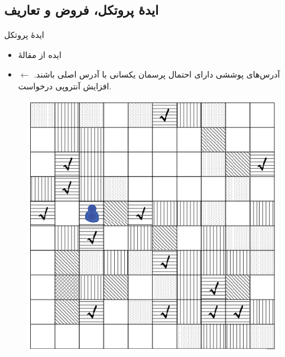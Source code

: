 \documentclass{beamer}
\begin{document}
\subsection{ایدهٔ پروتکل، فروض و تعاریف}
\begin{frame}{ایدهٔ پروتکل}
	\begin{multicols}{2}
		\begin{itemize}
			\item{%
				ایده از مقالهٔ 
			}
			\item{%
			آدرس‌های پوششی دارای احتمال پرسمان یکسانی با آدرس اصلی باشند.
		$\leftarrow$
	افزایش آنتروپی درخواست.}
		\end{itemize}
	\columnbreak
		\begin{figure}
			\centering
			\includegraphics[width=0.7\linewidth]{images/LBS_Kanonymity}
			\label{fig:lbskanonymity}
		\end{figure}
	\end{multicols}

\begin{center}
	{\small {}}
\end{center}
\end{frame}
\end{document}
